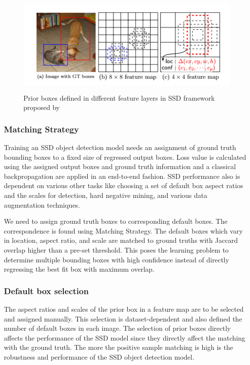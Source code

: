     \begin{figure}[H]
        \centering
        \includegraphics[width=15cm, height=5cm]{images/frameworks/SSD_default_boxes.png}
        \caption[Prior boxes design in \acrshort{ssd}]{Prior boxes defined in different feature layers in SSD framework proposed by \citet[p.24]{Liu2016SSDSS}}
        \label{fig:Fr-RCNN}
    \end{figure}
     
     \subsubsection{Matching Strategy}
     \label{matching_strategy}
     Training an SSD object detection model needs an assignment of ground truth bounding boxes to a fixed size of regressed output boxes. Loss value is calculated using the assigned output boxes and ground truth information and a classical backpropagation are applied in an end-to-end fashion. SSD performance also is dependent on various other tasks like choosing a set of default box aspect ratios and the scales for detection, hard negative mining, and various data augmentation techniques.
     
     We need to assign ground truth boxes to corresponding default boxes. The correspondence is found using Matching Strategy. The default boxes which vary in location, aspect ratio, and scale are matched to ground truths with Jaccard overlap higher than a pre-set threshold. This poses the learning problem to determine multiple bounding boxes with high confidence instead of directly regressing the best fit box with maximum overlap.
     
     \subsubsection{Default box selection}
     \label{default_box}
     The aspect ratios and scales of the prior box in a feature map are to be selected and assigned manually. This selection is dataset-dependent and also defined the number of default boxes in each image. The selection of prior boxes directly affects the performance of the SSD model since they directly affect the matching with the ground truth. The more the positive sample matching is high is the robustness and performance of the SSD object detection model.
     
